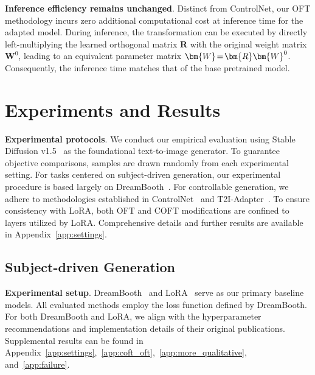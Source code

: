 \textbf{Inference efficiency remains unchanged}. Distinct from ControlNet, our OFT methodology incurs zero additional computational cost at inference time for the adapted model. During inference, the transformation can be executed by directly left-multiplying the learned orthogonal matrix $\bm{R}$ with the original weight matrix $\bm{W}^0$, leading to an equivalent parameter matrix $\thickmuskip=2mu \medmuskip=2mu \bm{W}=\bm{R}\bm{W}^0$. Consequently, the inference time matches that of the base pretrained model.

\section{Experiments and Results}

\textbf{Experimental protocols}. We conduct our empirical evaluation using Stable Diffusion v1.5~\cite{rombach2022high} as the foundational text-to-image generator. To guarantee objective comparisons, samples are drawn randomly from each experimental setting. For tasks centered on subject-driven generation, our experimental procedure is based largely on DreamBooth~\cite{ruiz2023dreambooth}. For controllable generation, we adhere to methodologies established in ControlNet~\cite{zhang2023adding} and T2I-Adapter~\cite{mou2023t2i}. To ensure consistency with LoRA, both OFT and COFT modifications are confined to layers utilized by LoRA. Comprehensive details and further results are available in Appendix~\ref{app:settings}.

\subsection{Subject-driven Generation}

\textbf{Experimental setup}. DreamBooth~\cite{ruiz2023dreambooth} and LoRA~\cite{hulora2022} serve as our primary baseline models. All evaluated methods employ the loss function defined by DreamBooth. For both DreamBooth and LoRA, we align with the hyperparameter recommendations and implementation details of their original publications. Supplemental results can be found in Appendix~\ref{app:settings},~\ref{app:coft_oft},~\ref{app:more_qualitative}, and~\ref{app:failure}.

